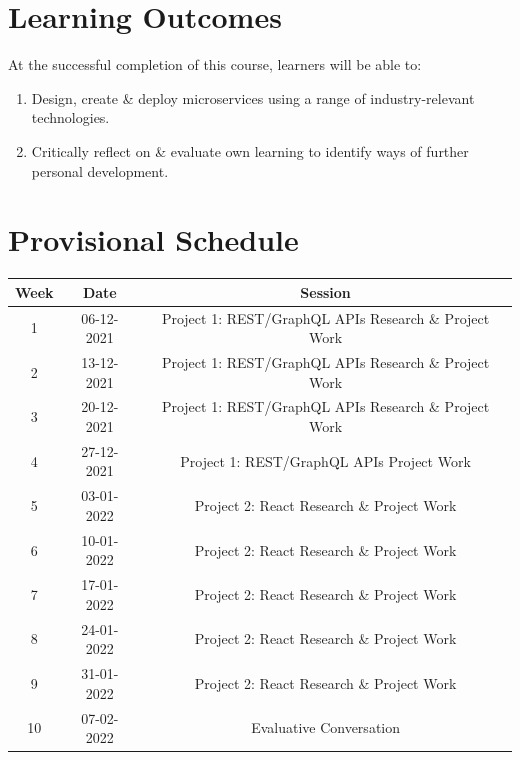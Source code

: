 \documentclass{article}
\begin{document}
\section*{Learning Outcomes}
At the successful completion of this course, learners will be able to:
\begin{enumerate}
	\item Design, create \& deploy microservices using a range of industry-relevant technologies. 
	\item Critically reflect on \& evaluate own learning to identify ways of further personal development.  
\end{enumerate}

\section*{Provisional Schedule}

\renewcommand{\arraystretch}{1.5}
\begin{tabular}{|c|c|c|c|}
	\hline
	\textbf{Week} & \textbf{Date}     & \multicolumn{2}{c|}{\textbf{Session}}        \\ \hline
	\small 1      & \small 06-12-2021 & \multicolumn{2}{c|}{Project 1: REST/GraphQL APIs Research \& Project Work} \\ \hline
	\small 2      & \small 13-12-2021 & \multicolumn{2}{c|}{Project 1: REST/GraphQL APIs Research \& Project Work} \\ \hline
	\small 3      & \small 20-12-2021 & \multicolumn{2}{c|}{Project 1: REST/GraphQL APIs Research \& Project Work} \\ \hline
	\small 4      & \small 27-12-2021 & \multicolumn{2}{c|}{Project 1: REST/GraphQL APIs Project Work} \\ \hline
	\small 5      & \small 03-01-2022 & \multicolumn{2}{c|}{Project 2: React Research \& Project Work} \\ \hline
	\small 6      & \small 10-01-2022 & \multicolumn{2}{c|}{Project 2: React Research \& Project Work} \\ \hline
	\small 7      & \small 17-01-2022 & \multicolumn{2}{c|}{Project 2: React Research \& Project Work} \\ \hline
	\small 8      & \small 24-01-2022 & \multicolumn{2}{c|}{Project 2: React Research \& Project Work} \\ \hline
	\small 9      & \small 31-01-2022 & \multicolumn{2}{c|}{Project 2: React Research \& Project Work} \\ \hline
	\small 10     & \small 07-02-2022 & \multicolumn{2}{c|}{Evaluative Conversation}        \\ \hline 
\end{tabular}
\end{document}
